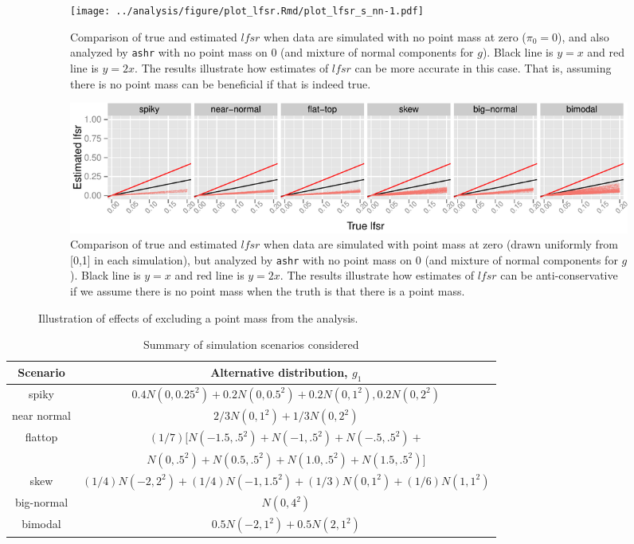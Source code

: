 \documentclass[11pt]{article}
\def\lfsr{\textit{lfsr}}
\def\ashr{{\tt ashr}\xspace}
\begin{document}
\begin{figure}
\begin{center}
\begin{subfigure}{\textwidth}
\texttt{[image: ../analysis/figure/plot\_lfsr.Rmd/plot\_lfsr\_s\_nn-1.pdf]} 
\caption{Comparison of true and estimated $\lfsr$ when data are simulated with no point mass at zero ($\pi_0=0$), and also analyzed by \ashr with no point mass on 0 (and mixture of normal components for $g$). Black line is $y=x$ and red line is $y=2x$. The results illustrate how estimates of $\lfsr$ can be more accurate in this case. That is, assuming there is no point mass can be beneficial if that is indeed true.}  \label{fig:lfsr-nn}
\end{subfigure}
\begin{subfigure}{\textwidth}
\includegraphics[width=\textwidth]{../analysis/figure/plot_lfsr.Rmd/plot_lfsr_s-1.pdf} 
\caption{Comparison of true and estimated $\lfsr$ when data are simulated with point mass at zero (drawn uniformly from [0,1] in each simulation), but analyzed by \ashr with no point mass on 0 (and mixture of normal components for $g$). Black line is $y=x$ and red line is $y=2x$. The results illustrate how estimates of $\lfsr$ can be anti-conservative if we assume there is no point mass when the truth is that there is a point mass.} \label{fig:lfsr-s}
\end{subfigure}
\end{center}
\caption{Illustration of effects of excluding a point mass from the analysis.} \label{fig:lfsr-nopointmass}
\end{figure}



\begin{table}[!ht]
\centering\begin{tabular}{c c } \toprule
Scenario & Alternative distribution, $g_1$  \\ \midrule
spiky & $0.4 N(0,0.25^2) + 0.2 N(0,0.5^2) + 0.2 N(0,1^2), 0.2 N(0,2^2) $\\
near normal & $2/3 N(0,1^2) + 1/3 N(0,2^2)$ \\
flattop& $(1/7) [N(-1.5,.5^2) + N(-1,.5^2) + N(-.5,.5^2) +$ \\
 &  $N(0,.5^2) +N(0.5,.5^2)  +N(1.0,.5^2) + N(1.5,.5^2)]$  \\
skew & $(1/4) N(-2,2^2) + (1/4) N(-1,1.5^2) +  (1/3) N(0,1^2) + (1/6) N(1,1^2) $\\
big-normal & $N(0,4^2)$ \\ 
bimodal & $0.5 N(-2,1^2) + 0.5 N(2,1^2)$ \\ \bottomrule
\end{tabular}
\caption{Summary of simulation scenarios considered} \label{table:scenarios}
\end{table}
\end{document}
